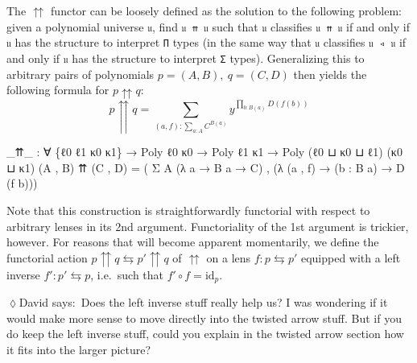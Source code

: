 \documentclass[
  11pt,
  oneside,
  article]{memoir}
\newenvironment{Shaded}{}{}
\newcommand{\NormalTok}[1]{#1}
\newcommand{\OtherTok}[1]{\textcolor[rgb]{0.00,0.44,0.13}{#1}}
\theoremstyle{definition}
\theoremstyle{plain}
\newcommand{\0}{\textsf{0}}
\newcommand{\1}{\tn{\textsf{1}}}
\newcommand{\dnote}[1]{{\quad \color{blue}$\lozenge$\;David says:}~#1\;{\color{blue}$\lozenge$}\quad}
\begin{document}
The \(\upuparrows\) functor can be loosely defined as the solution to
the following problem: given a polynomial universe \texttt{𝔲}, find
\texttt{𝔲\ ⇈\ 𝔲} such that \texttt{𝔲} classifies \texttt{𝔲\ ⇈\ 𝔲} if and
only if \texttt{𝔲} has the structure to interpret \texttt{Π} types (in
the same way that \texttt{𝔲} classifies \texttt{𝔲\ ◃\ 𝔲} if and only if
\texttt{𝔲} has the structure to interpret \texttt{Σ} types).
Generalizing this to arbitrary pairs of polynomials
\(p = (A , B), ~ q = (C , D)\) then yields the following formula for
\(p \upuparrows q\): \[
p \upuparrows q = \sum_{(a , f) : \sum_{a : A} C^{B(a)}} y^{\prod_{b : B(a)} D(f(b))}
\]

\begin{Shaded}
\begin{Highlighting}[]
\OtherTok{\_}\NormalTok{⇈}\OtherTok{\_} \OtherTok{:} \OtherTok{∀} \OtherTok{\{}\NormalTok{ℓ0 ℓ1 κ0 κ1}\OtherTok{\}} \OtherTok{→}\NormalTok{ Poly ℓ0 κ0 }\OtherTok{→}\NormalTok{ Poly ℓ1 κ1 }
      \OtherTok{→}\NormalTok{ Poly }\OtherTok{(}\NormalTok{ℓ0 ⊔ κ0 ⊔ ℓ1}\OtherTok{)} \OtherTok{(}\NormalTok{κ0 ⊔ κ1}\OtherTok{)}
\OtherTok{(}\NormalTok{A , B}\OtherTok{)}\NormalTok{ ⇈ }\OtherTok{(}\NormalTok{C , D}\OtherTok{)} \OtherTok{=} 
    \OtherTok{(}\NormalTok{ Σ A }\OtherTok{(λ}\NormalTok{ a }\OtherTok{→}\NormalTok{ B a }\OtherTok{→}\NormalTok{ C}\OtherTok{)} 
\NormalTok{    , }\OtherTok{(λ} \OtherTok{(}\NormalTok{a , f}\OtherTok{)} \OtherTok{→} \OtherTok{(}\NormalTok{b }\OtherTok{:}\NormalTok{ B a}\OtherTok{)} \OtherTok{→}\NormalTok{ D }\OtherTok{(}\NormalTok{f b}\OtherTok{)))}
\end{Highlighting}
\end{Shaded}

Note that this construction is straightforwardly functorial with respect
to arbitrary lenses in its 2nd argument. Functoriality of the 1st
argument is trickier, however. For reasons that will become apparent
momentarily, we define the functorial action
\(p \upuparrows q \leftrightarrows p' \upuparrows q\) of \(\upuparrows\)
on a lens \(f : p \leftrightarrows p'\) equipped with a left inverse
\(f' : p' \leftrightarrows p\), i.e.~such that
\(f' \circ f = \text{id}_p\).

\dnote{Does the left inverse stuff really help us? I was wondering if it would make more sense to move directly into the twisted arrow stuff. But if you do keep the left inverse stuff, could you explain in the twisted arrow section how it fits into the larger picture?}
\end{document}

